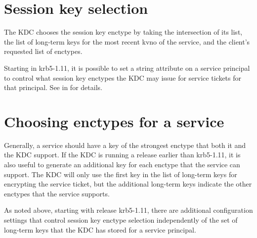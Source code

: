 \documentclass[letterpaper,10pt,english]{sphinxmanual}
\begin{document}
\section{Session key selection}
\label{\detokenize{admin/enctypes:session-key-selection}}\label{\detokenize{admin/enctypes:id1}}
The KDC chooses the session key enctype by taking the intersection of
its  list, the list of long-term keys for the
most recent kvno of the service, and the client’s requested list of
enctypes.

Starting in krb5-1.11, it is possible to set a string attribute on a
service principal to control what session key enctypes the KDC may
issue for service tickets for that principal.  See {\hyperref[\detokenize{admin/admin_commands/kadmin_local:set-string}]{}}
in {\hyperref[\detokenize{admin/admin_commands/kadmin_local:kadmin-1}]{}} for details.


\section{Choosing enctypes for a service}
\label{\detokenize{admin/enctypes:choosing-enctypes-for-a-service}}
Generally, a service should have a key of the strongest
enctype that both it and the KDC support.  If the KDC is running a
release earlier than krb5-1.11, it is also useful to generate an
additional key for each enctype that the service can support.  The KDC
will only use the first key in the list of long-term keys for encrypting
the service ticket, but the additional long-term keys indicate the
other enctypes that the service supports.

As noted above, starting with release krb5-1.11, there are additional
configuration settings that control session key enctype selection
independently of the set of long-term keys that the KDC has stored for
a service principal.
\end{document}
